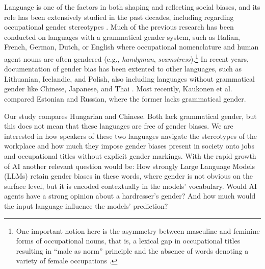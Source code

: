 \documentclass[runningheads]{llncs}
\renewcommand\cite{\citep}    %
\begin{document}
Language is one of the factors in both shaping and reflecting social biases, and its role has been extensively studied in the past decades, including regarding occupational gender stereotypes \citep[cf.][]{sabatini_1985_occupational,pauwels_1997_handymen,gygax_2008_generically,misersky_2014_norms,lewis_2020_gender,kaukonen_2025_gender}. Much of the previous research has been conducted on languages with a grammatical gender system, such as Italian, French, German, Dutch, or English where occupational nomenclature and human agent nouns are often gendered (e.g., \textit{handyman}, \textit{seamstress}).\footnote{One important notion here is the asymmetry between masculine and feminine forms of occupational nouns, that is, a lexical gap in occupational titles resulting in ``male as norm'' principle and the absence of words denoting a variety of female occupations \citep{baron_1986_grammar,sabatini_1985_occupational,yaguello_1978_mots,pauwels_2003_linguistic,lassonde_2013_occupational}.} 
In recent years, documentation of gender bias has been extented to other languages, such as Lithuanian, Icelandic, and Polish, also including languages without grammatical gender like Chinese, Japanese, and Thai \cite[][]{hellinger_2003_gender,pauwels_2003_linguistic}. Most recently, Kaukonen et al. \cite{kaukonen_2025_gender} compared Estonian and Russian, where the former lacks grammatical gender.

Our study compares Hungarian and Chinese. Both lack grammatical gender, but this does not mean that these languages are free of gender biases. We are interested in how speakers of these two languages navigate the stereotypes of the workplace and how much they impose gender biases present in society onto jobs and occupational titles without explicit gender markings. With the rapid growth of AI another relevant question would be: How strongly Large Language Models (LLMs) retain gender biases in these words, where gender is not obvious on the surface level, but it is encoded contextually in the models' vocabulary. Would AI agents have a strong opinion about a hardresser's gender? And how much would the input language influence the models' prediction?
\end{document}
